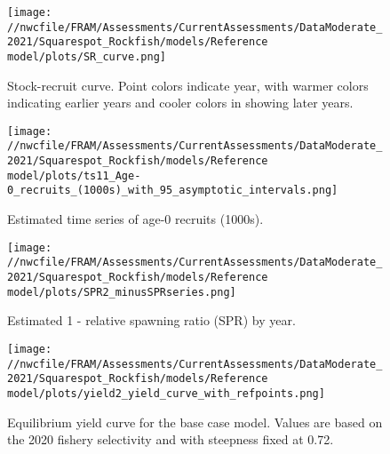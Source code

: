 \documentclass[11pt,
  english,
  a4paper,
]{article}
\begin{document}
\tagmcend\tagstructend


\begin{figure}
\centering
\texttt{[image: //nwcfile/FRAM/Assessments/CurrentAssessments/DataModerate\_2021/Squarespot\_Rockfish/models/Reference model/plots/SR\_curve.png]}
\caption{Stock-recruit curve. Point colors indicate year, with warmer colors indicating earlier years and cooler colors in showing later years.\label{fig:bh-curve}}
\end{figure}

\tagmcend\tagstructend


\begin{figure}
\centering
\texttt{[image: //nwcfile/FRAM/Assessments/CurrentAssessments/DataModerate\_2021/Squarespot\_Rockfish/models/Reference model/plots/ts11\_Age-0\_recruits\_(1000s)\_with\_95\_asymptotic\_intervals.png]}
\caption{Estimated time series of age-0 recruits (1000s).\label{fig:recruits}}
\end{figure}

\tagmcend\tagstructend


\begin{figure}
\centering
\texttt{[image: //nwcfile/FRAM/Assessments/CurrentAssessments/DataModerate\_2021/Squarespot\_Rockfish/models/Reference model/plots/SPR2\_minusSPRseries.png]}
\caption{Estimated 1 - relative spawning ratio (SPR) by year.\label{fig:1-spr}}
\end{figure}

\tagmcend\tagstructend


\begin{figure}
\centering
\texttt{[image: //nwcfile/FRAM/Assessments/CurrentAssessments/DataModerate\_2021/Squarespot\_Rockfish/models/Reference model/plots/yield2\_yield\_curve\_with\_refpoints.png]}
\caption{Equilibrium yield curve for the base case model. Values are based on the 2020 fishery selectivity and with steepness fixed at 0.72.\label{fig:yield}}
\end{figure}
\end{document}
